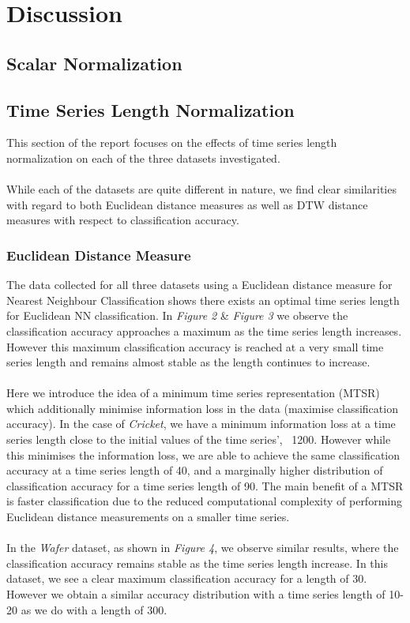 \documentclass[10pt,a4paper]{article}
\begin{document}
\section{Discussion}

\subsection{Scalar Normalization}



\subsection{Time Series Length Normalization}
This section of the report focuses on the effects of time series length normalization on each of the three datasets investigated.
\\\\
While each of the datasets are quite different in nature, we find clear similarities with regard to both Euclidean distance measures as well as DTW distance measures with respect to classification accuracy.

\subsubsection{Euclidean Distance Measure}
The data collected for all three datasets using a Euclidean distance measure for Nearest Neighbour Classification shows there exists an optimal time series length for Euclidean NN classification.
In \textit{Figure 2} \& \textit{Figure 3} we observe the classification accuracy approaches a maximum as the time series length increases.
However this maximum classification accuracy is reached at a very small time series length  and remains almost stable as the length continues to increase.
\\\\
Here we introduce the idea of a minimum time series representation (MTSR) which additionally minimise information loss in the data (maximise classification accuracy).
In the case of \textit{Cricket}, we have a minimum information loss at a time series length close to the initial values of the time series', ~1200.
However while this minimises the information loss, we are able to achieve the same classification accuracy at a time series length of 40, and a marginally higher distribution of classification accuracy for a time series length of 90.
The main benefit of a MTSR is faster classification due to the reduced computational complexity of performing Euclidean distance measurements on a smaller time series.
\\\\
In the \textit{Wafer} dataset, as shown in \textit{Figure 4}, we observe similar results, where the classification accuracy remains stable as the time series length increase.
In this dataset, we see a clear maximum classification accuracy for a length of 30.
However we obtain a similar accuracy distribution with a time series length of 10-20 as we do with a length of 300.
\end{document}
